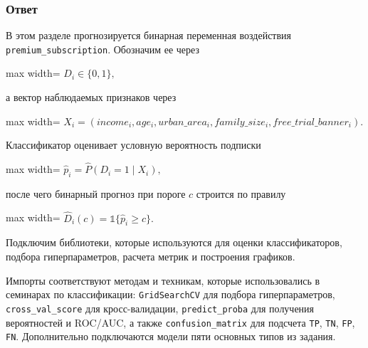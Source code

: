 \documentclass[11pt]{article}
\begin{document}
\subsubsection{Ответ}

В этом разделе прогнозируется бинарная переменная воздействия
\texttt{premium\_subscription}. Обозначим ее через

\begin{center}
\begin{adjustbox}{max width=\linewidth}
\(\displaystyle D_i \in \{0,1\},\)
\end{adjustbox}
\end{center}

а вектор наблюдаемых признаков через

\begin{center}
\begin{adjustbox}{max width=\linewidth}
\(\displaystyle X_i = (income_i, age_i, urban\_area_i, family\_size_i, free\_trial\_banner_i).\)
\end{adjustbox}
\end{center}

Классификатор оценивает условную вероятность подписки

\begin{center}
\begin{adjustbox}{max width=\linewidth}
\(\displaystyle \hat p_i = \widehat{P}(D_i = 1 \mid X_i),\)
\end{adjustbox}
\end{center}

после чего бинарный прогноз при пороге \(c\) строится по правилу

\begin{center}
\begin{adjustbox}{max width=\linewidth}
\(\displaystyle \hat D_i(c) = \mathbb{1}\{\hat p_i \ge c\}.\)
\end{adjustbox}
\end{center}

    Подключим библиотеки, которые используются для оценки классификаторов,
подбора гиперпараметров, расчета метрик и построения графиков.

    Импорты соответствуют методам и техникам, которые использовались в
семинарах по классификации: \texttt{GridSearchCV} для подбора
гиперпараметров, \texttt{cross\_val\_score} для кросс-валидации,
\texttt{predict\_proba} для получения вероятностей и ROC/AUC, а также
\texttt{confusion\_matrix} для подсчета \texttt{TP}, \texttt{TN},
\texttt{FP}, \texttt{FN}. Дополнительно подключаются модели пяти
основных типов из задания.
\end{document}
